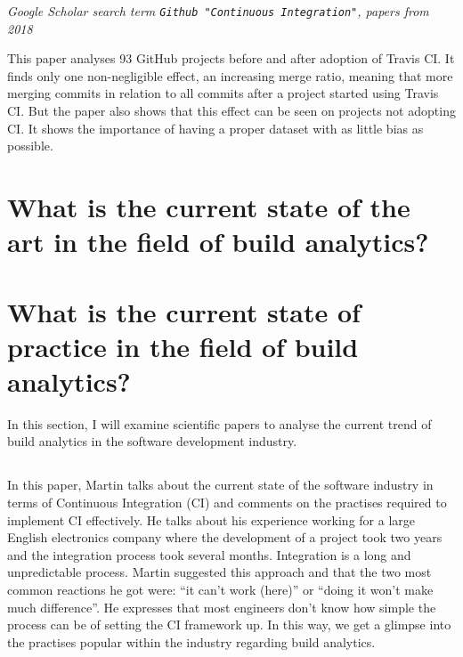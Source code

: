 \documentclass[]{book}
\begin{document}
\emph{Google Scholar search term
\texttt{Github\ "Continuous\ Integration"}, papers from 2018}

This paper analyses 93 GitHub projects before and after adoption of
Travis CI. It finds only one non-negligible effect, an increasing merge
ratio, meaning that more merging commits in relation to all commits
after a project started using Travis CI. But the paper also shows that
this effect can be seen on projects not adopting CI. It shows the
importance of having a proper dataset with as little bias as possible.

\section{What is the current state of the art in the field of build
analytics?}\label{what-is-the-current-state-of-the-art-in-the-field-of-build-analytics}

\section{What is the current state of practice in the field of build
analytics?}\label{what-is-the-current-state-of-practice-in-the-field-of-build-analytics}

In this section, I will examine scientific papers to analyse the current
trend of build analytics in the software development industry.

\subsection{\texorpdfstring{\citet{fowler2006continuous}}{@fowler2006continuous}}\label{fowler2006continuous}

In this paper, Martin talks about the current state of the software
industry in terms of Continuous Integration (CI) and comments on the
practises required to implement CI effectively. He talks about his
experience working for a large English electronics company where the
development of a project took two years and the integration process took
several months. Integration is a long and unpredictable process. Martin
suggested this approach and that the two most common reactions he got
were: ``it can't work (here)'' or ``doing it won't make much
difference''. He expresses that most engineers don't know how simple the
process can be of setting the CI framework up. In this way, we get a
glimpse into the practises popular within the industry regarding build
analytics.
\end{document}
